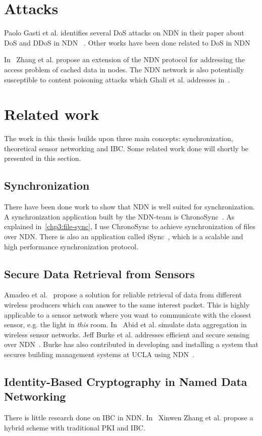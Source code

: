 
\section{Attacks}

Paolo Gasti et al. identifies several \gls{DoS} attacks on \gls{NDN} in their paper about \gls{DoS} and \gls{DDoS} in \gls{NDN} ~\cite{DBLP:conf/icccn/GastiTU013}. 
Other works have been done related to \gls{DoS} in \gls{NDN}~\cite{DBLP:journals/ijcomsys/WangCZQZ14, DBLP:conf/ancs/SoNO13, DBLP:journals/corr/abs-1303-4823}

In~\cite{DBLP:journals/tifs/LiZZSF15} Zhang et al. propose an extension of the \gls{NDN} protocol for addressing the access problem of cached \gls{data} in nodes.  
The \gls{NDN} network is also potentially susceptible to content poisoning attacks which Ghali et al. addresses in~\cite{DBLP:journals/ccr/GhaliTU14}.

\section{Related work}
The work in this thesis builds upon three main concepts: synchronization, theoretical sensor networking and \gls{IBC}. 
Some related work done will shortly be presented in this section.

\subsection{Synchronization}
There have been done work to show that \gls{NDN} is well suited for synchronization. 
A synchronization application built by the \gls{NDN}-team is ChronoSync~\cite{DBLP:conf/icnp/ZhuA13}.
As explained in~\autoref{chp3:file-sync}, I use ChronoSync to achieve synchronization of files over \gls{NDN}.
There is also an application called iSync~\cite{DBLP:conf/acmicn/FuAC14}, which is a scalable and high performance synchronization protocol.

\subsection{Secure Data Retrieval from Sensors}
Amadeo et al.~\cite{DBLP:conf/acmicn/AmadeoCM14} propose a solution for reliable retrieval of \gls{data} from different wireless producers which can answer to the same \gls{interest} packet. This is highly applicable to a sensor network where you want to communicate with the closest sensor, e.g. the light in \textit{this} room.
In~\cite{DBLP:conf/noms/AbidySLF14} Abid et al. simulate \gls{data} aggregation in wireless sensor networks.
Jeff Burke et al. addresses efficient and secure sensing over \gls{NDN}~\cite{DBLP:conf/nca/BurkeGNT14}.
Burke has also contributed in developing and installing a system that secures building management systems at \gls{UCLA} using \gls{NDN}~\cite{DBLP:journals/network/ShangDMBZ14}.

\subsection{Identity-Based Cryptography in Named Data Networking}
There is little research done on \gls{IBC} in \gls{NDN}. 
In~\cite{DBLP:conf/icnp/ZhangCXWSW11} Xinwen Zhang et al. propose a hybrid scheme with traditional \gls{PKI} and \gls{IBC}.

